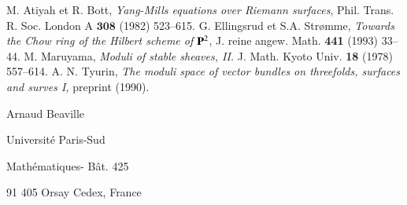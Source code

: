 {
\renewcommand{\bibname}{R\'ef\'erences}
\begin{thebibliography}{99}
 M. Atiyah et R. Bott, \textit{Yang-Mills equations over Riemann surfaces}, Phil. Trans. R. Soc. London A $\mathbf{308}$ (1982) 523--615.
 G. Ellingsrud et S.A. Str\o mme, \textit{Towards the Chow ring of the Hilbert scheme of} $\mathbf{P}^{2}$, J. reine angew. Math. {\bf 441} (1993) 33--44.
 M. Maruyama, \textit{Moduli of stable sheaves, II.} J. Math. Kyoto Univ. {\bf 18} (1978) 557--614.
 A. N. Tyurin, \textit{The moduli space of vector bundles on threefolds, surfaces and surves I,} preprint (1990).
\end{thebibliography}}

\begin{flushleft}
Arnaud Beaville

Universit\'e Paris-Sud

Math\'ematiques- B\^at. 425

91 405 Orsay Cedex, France
\end{flushleft}
